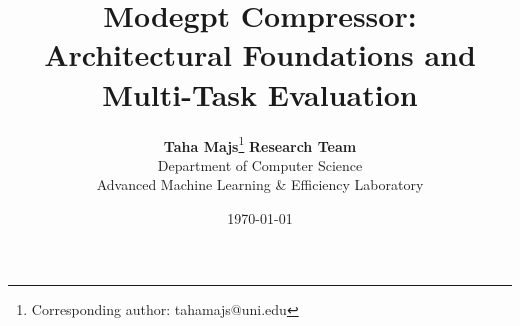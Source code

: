 \title{\textbf{Modegpt Compressor: Architectural Foundations and Multi-Task Evaluation}}

\author{
  \textbf{Taha Majs}\thanks{Corresponding author: tahamajs@uni.edu} \quad \textbf{Research Team} \\
  Department of Computer Science \\
  Advanced Machine Learning \& Efficiency Laboratory
}

\date{\today}
